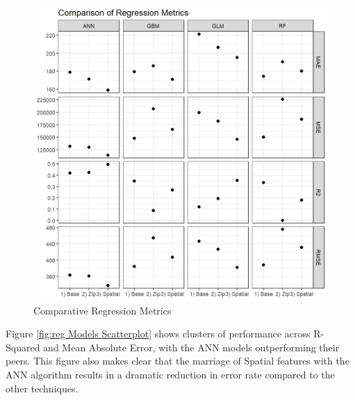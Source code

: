 \documentclass[12pt,]{article}
\begin{document}
\begin{figure}[H]
\includegraphics[width=1\linewidth]{Sections/tables and figures/compare_reg_model_rmse} \caption{Comparative Regression Metrics}\label{fig:Model RMSE Comparrison}
\end{figure}

\noindent Figure \ref{fig:reg Models Scatterplot} shows clusters of
performance across R-Squared and Mean Absolute Error, with the ANN
models outperforming their peers. This figure also makes clear that the
marriage of Spatial features with the ANN algorithm results in a
dramatic reduction in error rate compared to the other techniques.
\end{document}
